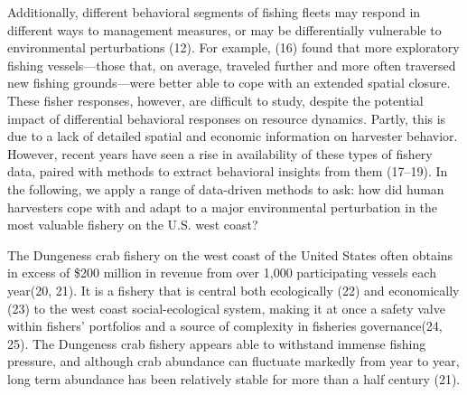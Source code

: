 \documentclass[9pt,twocolumn,twoside,lineno]{pnas-new}
\begin{document}
Additionally, different behavioral segments of fishing fleets may
respond in different ways to management measures, or may be
differentially vulnerable to environmental perturbations (12). For
example, (16) found that more exploratory fishing vessels---those that,
on average, traveled further and more often traversed new fishing
grounds---were better able to cope with an extended spatial closure.
These fisher responses, however, are difficult to study, despite the
potential impact of differential behavioral responses on resource
dynamics. Partly, this is due to a lack of detailed spatial and economic
information on harvester behavior. However, recent years have seen a
rise in availability of these types of fishery data, paired with methods
to extract behavioral insights from them (17--19). In the following, we
apply a range of data-driven methods to ask: how did human harvesters
cope with and adapt to a major environmental perturbation in the most
valuable fishery on the U.S. west coast?

The Dungeness crab fishery on the west coast of the United States often
obtains in excess of \$200 million in revenue from over 1,000
participating vessels each year(20, 21). It is a fishery that is central
both ecologically (22) and economically (23) to the west coast
social-ecological system, making it at once a safety valve within
fishers' portfolios and a source of complexity in fisheries
governance(24, 25). The Dungeness crab fishery appears able to withstand
immense fishing pressure, and although crab abundance can fluctuate
markedly from year to year, long term abundance has been relatively
stable for more than a half century (21).
\end{document}

